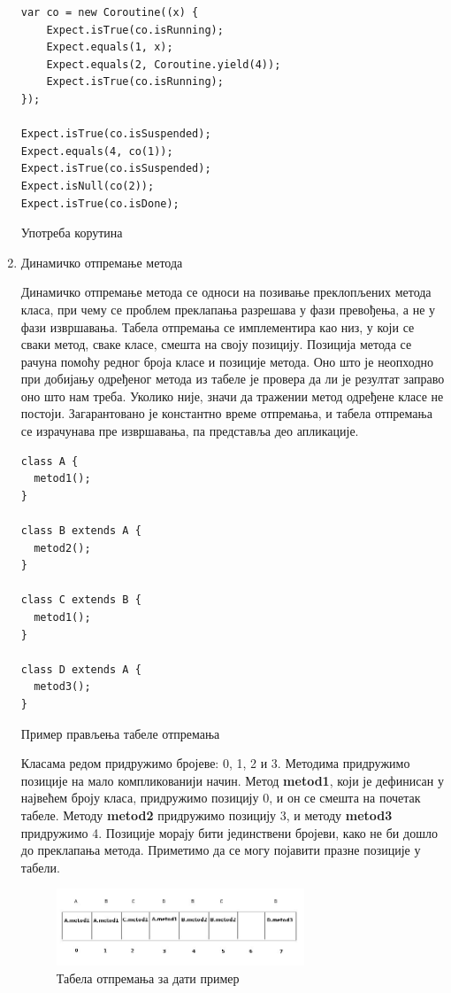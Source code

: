\documentclass[12pt,oneside]{memoir}
\begin{document}
\begin{enumerate}
\begin{listing}
\begin{verbatim}
var co = new Coroutine((x) {
    Expect.isTrue(co.isRunning);
    Expect.equals(1, x);
    Expect.equals(2, Coroutine.yield(4));
    Expect.isTrue(co.isRunning);
});

Expect.isTrue(co.isSuspended);
Expect.equals(4, co(1));
Expect.isTrue(co.isSuspended);
Expect.isNull(co(2));
Expect.isTrue(co.isDone);
\end{verbatim}
\caption{Употреба корутина}
\label{coroutines}
\end{listing}

\item Динамичко отпремање метода

Динамичко отпремање метода се односи на позивање преклопљених метода класа, при чему се проблем преклапања разрешава у фази превођења, а не у фази извршавања. Табела отпремања се имплементира као низ, у који се сваки метод, сваке класе, смешта на своју позицију. Позиција метода се рачуна помоћу редног броја класе и  позиције метода. Оно што је неопходно при добијању одређеног метода из табеле је провера да ли је резултат заправо оно што нам треба. Уколико није, значи да тражении метод одређене класе не постоји. Загарантовано је константно време отпремања, и табела отпремања се израчунава пре извршавања, па представља део апликације.

\begin{listing}
\begin{verbatim}
class A {
  metod1();
}

class B extends A {
  metod2();
}

class C extends B {
  metod1();
}

class D extends A {
  metod3();
}
\end{verbatim}
\caption{Пример прављења табеле отпремања}
\label{dispatchTable}
\end{listing}

Класама редом придружимо бројеве: 0, 1, 2 и 3. Методима придружимо позиције на мало компликованији начин. Метод \textbf{metod1}, који је дефинисан у највећем броју класа, придружимо позицију 0, и он се смешта на почетак табеле. Методу \textbf{metod2} придружимо позицију 3, и методу \textbf{metod3} придружимо 4. Позиције морају бити јединствени бројеви, како не би дошло до преклапања метода. Приметимо да се могу појавити празне позиције у табели.

\begin{figure}[!ht]
  \centering
  \includegraphics[width=0.7\textwidth]{otpremanje.jpg}
  \caption{Табела отпремања за дати пример}
  \label{fig:model}
\end{figure}


\end{enumerate}
\end{document}
